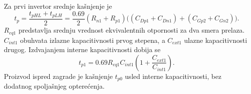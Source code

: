 Za prvi invertor srednje kašnjenje je
\[t_p=\frac{t_{pHL}+t_{pLH}}2=\frac{0.69}2(R_{n1}+R_{p1})
\bigl((C_{Dp1}+C_{Dn1})+(C_{Gp2}+C_{Gn2})\bigr).
\]
$R_{eq1}$ predstavlja srednju vrednost ekvivalentnih otpornosti za dva smera prelaza. $C_{int1}$ obuhvata izlazne kapacitivnosti prvog stepena, a $C_{ext1}$ ulazne kapacitivnosti drugog. Izdvajanjem interne kapacitivnosti dobija se
\[t_{p1}=0.69R_{eq1}C_{int1}\left(1+\frac{C_{ext1}}{C_{int1}}\right).
\]
Proizvod ispred zagrade je kašnjenje $t_{p0}$ usled interne kapacitivnosti, bez dodatnog spoljašnjeg opterećenja.
